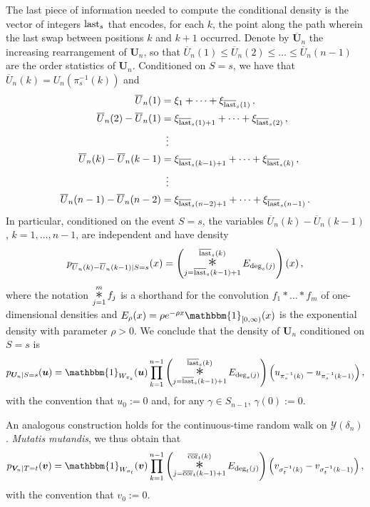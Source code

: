 \documentclass[a4paper,reqno,12pt]{amsart}
\theoremstyle{plain}
\theoremstyle{definition}
\newcommand{\staircase}{\delta}
\newcommand{\young}{\mathcal{Y}}
\newcommand{\diag}{\textnormal{cor}}
\newcommand{\diagsorted}{\overline{\diag}}
\newcommand{\fin}{\textnormal{last}}
\newcommand{\finsorted}{\overline{\fin}}
\newcommand{\Usorted}{\overline{U}}
\newcommand{\bmUsorted}{\overline{\bm{U}}}
\newcommand{\1}{\mathbbm{1}}
\begin{document}
The last piece of information needed to compute the conditional density is the vector of integers $\fin_s$ that encodes, for each $k$, the point along the path wherein the last swap between positions $k$ and $k+1$ occurred.
Denote by $\bmUsorted_n$ the increasing rearrangement of  $\bm{U}_n$, so that $\Usorted_n(1) \leq  \Usorted_n(2) \leq \ldots  \leq \Usorted_n(n-1)$ are the order statistics of $\bm{U}_n$.
Conditioned on $S=s$, we have that $\Usorted_n(k) = U_n(\pi_s^{-1}(k))$ and
\begin{align*}
\Usorted_n(1)&=\xi_1+\cdots+\xi_{\finsorted_s(1)} \, ,\\
\Usorted_n(2)-\Usorted_n(1)&=\xi_{\finsorted_s(1)+1}+\cdots+\xi_{\finsorted_s(2)} \, ,\\
&\,\,\,\vdots\\
\Usorted_n(k)-\Usorted_n(k-1)&=\xi_{\finsorted_s(k-1)+1}+\cdots+\xi_{\finsorted_s(k)} \, ,\\
&\,\,\,\vdots\\
\Usorted_n(n-1)-\Usorted_n(n-2)&=\xi_{\finsorted_s(n-2)+1}+\cdots+\xi_{\finsorted_s(n-1)} \, .
\end{align*}
In particular, conditioned on the event $S=s$, the variables $\Usorted_n(k)-\Usorted_n(k-1)$, $k=1,\dots, n-1$, are independent and have density
\newcommand{\convolutionop}{\mathop{\mathlarger{\mathlarger{\mathlarger{*}}}}}
\[
p_{\Usorted_n(k)-\Usorted_n(k-1)|S=s} (x)=\left(\convolutionop_{j=\finsorted_s(k-1)+1}^{\finsorted_s(k)} 
E_{\deg_s(j)}\right) \left(x\right), 
\]
where the notation $\convolutionop\limits_{j=1}^m f_j$ is a shorthand for the convolution $f_1 * \ldots * f_m$ of one-dimensional densities and $E_\rho(x)= \rho e^{-\rho x} \1_{[0,\infty)}(x)$ is the exponential density with parameter $\rho>0$. 
We conclude that the density of $\bm{U}_n$ conditioned on $S=s$ is
\begin{equation}
\label{eq:joint-density-un_conditioned}
p_{\bm{U}_n|S=s}(\bm{u})
=
\1_{W_{\pi_s}}(\bm{u})
\prod_{k=1}^{n-1}  \left(\convolutionop_{j=\finsorted_s(k-1)+1}^{\finsorted_s(k)} 
E_{\deg_s(j)}\right) \left(u_{\pi_s^{-1}(k)}-u_{\pi_s^{-1}(k-1)}\right) ,
\end{equation}
with the convention that $u_0:=0$ and, for any $\gamma\in S_{n-1}$, $\gamma(0):=0$.

An analogous construction holds for the continuous-time random walk on $\young(\staircase_n)$.
\emph{Mutatis mutandis}, we thus obtain that
\begin{equation}
\label{eq:joint-density-vn_conditioned}
p_{\bm{V}_n|T=t}(\bm{v})
=
\1_{W_{\sigma_t}}(\bm{v})
\prod_{k=1}^{n-1}\left(\convolutionop_{j=\diagsorted_t(k-1)+1}^{\diagsorted_t(k)} 
E_{\deg_t(j)} \right) \left(v_{\sigma_t^{-1}(k)}-v_{\sigma_t^{-1}(k-1)}\right) ,
\end{equation}
with the convention that $v_0:=0$.
\end{document}
